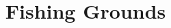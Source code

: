 \documentclass{beamer}
\title{Fishing Grounds}
\author{}
\date{}
\begin{document}
\begin{frame}
\titlepage
\end{frame}
\end{document}
